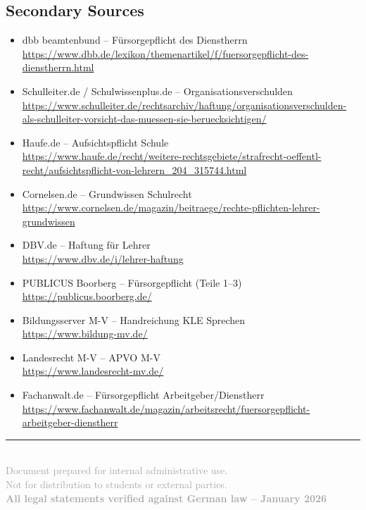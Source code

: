 \documentclass[11pt,a4paper]{article}
\begin{document}
\subsection{Secondary Sources}

\begin{itemize}
    \item dbb beamtenbund -- Fürsorgepflicht des Dienstherrn\\
    \url{https://www.dbb.de/lexikon/themenartikel/f/fuersorgepflicht-des-dienstherrn.html}

    \item Schulleiter.de / Schulwissenplus.de -- Organisationsverschulden\\
    \url{https://www.schulleiter.de/rechtsarchiv/haftung/organisationsverschulden-als-schulleiter-vorsicht-das-muessen-sie-beruecksichtigen/}

    \item Haufe.de -- Aufsichtspflicht Schule\\
    \url{https://www.haufe.de/recht/weitere-rechtsgebiete/strafrecht-oeffentl-recht/aufsichtspflicht-von-lehrern_204_315744.html}

    \item Cornelsen.de -- Grundwissen Schulrecht\\
    \url{https://www.cornelsen.de/magazin/beitraege/rechte-pflichten-lehrer-grundwissen}

    \item DBV.de -- Haftung für Lehrer\\
    \url{https://www.dbv.de/i/lehrer-haftung}

    \item PUBLICUS Boorberg -- Fürsorgepflicht (Teile 1--3)\\
    \url{https://publicus.boorberg.de/}

    \item Bildungsserver M-V -- Handreichung KLE Sprechen\\
    \url{https://www.bildung-mv.de/}

    \item Landesrecht M-V -- APVO M-V\\
    \url{https://www.landesrecht-mv.de/}

    \item Fachanwalt.de -- Fürsorgepflicht Arbeitgeber/Dienstherr\\
    \url{https://www.fachanwalt.de/magazin/arbeitsrecht/fuersorgepflicht-arbeitgeber-dienstherr}
\end{itemize}

\vspace{2em}

\begin{center}
\rule{0.5\textwidth}{0.4pt}\\[1em]
{\small\textcolor{darkgray}{Document prepared for internal administrative use.\\
Not for distribution to students or external parties.\\[0.5em]
\textbf{All legal statements verified against German law -- January 2026}}}
\end{center}
\end{document}
